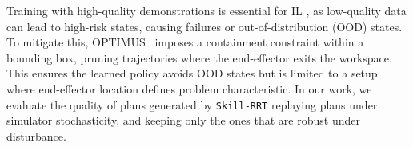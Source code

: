 Training with high-quality demonstrations is essential for IL \cite{mandlekar2022matters}, as low-quality data can lead to high-risk states, causing failures or out-of-distribution (OOD) states. To mitigate this, OPTIMUS~\cite{dalal2023imitating} imposes a containment constraint within a bounding box, pruning trajectories where the end-effector exits the workspace. This ensures the learned policy avoids OOD states but is limited to a setup where end-effector location defines problem characteristic. In our work, we evaluate the quality of plans generated by \texttt{Skill-RRT} replaying plans under simulator stochasticity, and keeping only the ones that are robust under disturbance.